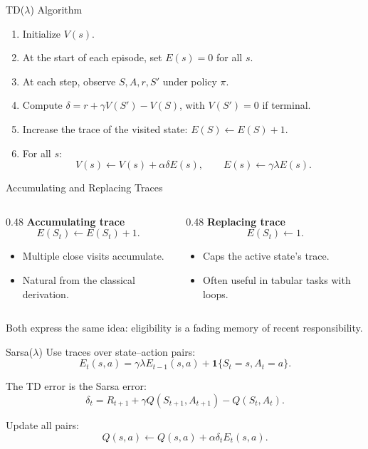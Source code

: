 \documentclass[aspectratio=169]{beamer}
\newcommand{\one}{\mathbf{1}}
\begin{document}
\begin{frame}{TD($\lambda$) Algorithm}
\small
\begin{enumerate}
    \item Initialize $V(s)$.
    \item At the start of each episode, set $E(s)=0$ for all $s$.
    \item At each step, observe $S,A,r,S'$ under policy $\pi$.
    \item Compute $\delta=r+\gamma V(S')-V(S)$, with $V(S')=0$ if terminal.
    \item Increase the trace of the visited state: $E(S)\leftarrow E(S)+1$.
    \item For all $s$:
    \[
    V(s)\leftarrow V(s)+\alpha\delta E(s),
    \qquad
    E(s)\leftarrow\gamma\lambda E(s).
    \]
\end{enumerate}
\end{frame}

\begin{frame}{Accumulating and Replacing Traces}
\small
\begin{columns}[T,onlytextwidth]
\begin{column}{0.48\textwidth}
\textbf{Accumulating trace}
\[
E(S_t)\leftarrow E(S_t)+1.
\]
\begin{itemize}
    \item Multiple close visits accumulate.
    \item Natural from the classical derivation.
\end{itemize}
\end{column}
\begin{column}{0.48\textwidth}
\textbf{Replacing trace}
\[
E(S_t)\leftarrow 1.
\]
\begin{itemize}
    \item Caps the active state's trace.
    \item Often useful in tabular tasks with loops.
\end{itemize}
\end{column}
\end{columns}

\vspace{0.7em}
Both express the same idea: eligibility is a fading memory of recent responsibility.
\end{frame}

\begin{frame}{Sarsa($\lambda$)}
\small
Use traces over state--action pairs:
\[
E_t(s,a)=\gamma\lambda E_{t-1}(s,a)+\one\{S_t=s,A_t=a\}.
\]

The TD error is the Sarsa error:
\[
\delta_t=R_{t+1}+\gamma Q(S_{t+1},A_{t+1})-Q(S_t,A_t).
\]

Update all pairs:
\[
Q(s,a)\leftarrow Q(s,a)+\alpha\delta_t E_t(s,a).
\]
\end{frame}
\end{document}
